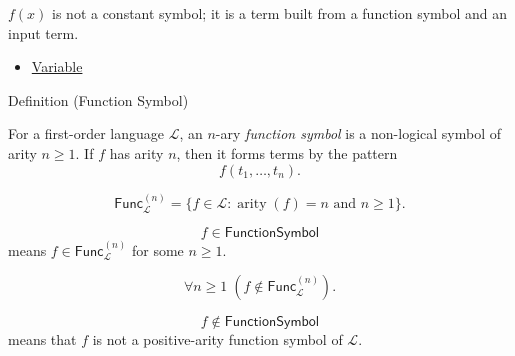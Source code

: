 \begin{remark*}
\(f(x)\) is not a constant symbol; it is a term built from a function symbol
and an input term.
\end{remark*}

\begin{dependencies}
\begin{itemize}
  \item \hyperref[def:variable]{Variable}
\end{itemize}
\end{dependencies}

\begin{definitionbox}{Definition (Function Symbol)}
\begin{definition}
\label{def:function-symbol}
For a first-order language \(\mathcal L\), an \(n\)-ary \emph{function symbol}
is a non-logical symbol of arity \(n\geq 1\). If \(f\) has arity \(n\), then it
forms terms by the pattern
\[
f(t_1,\ldots,t_n).
\]
\end{definition}
\end{definitionbox}

\begin{remark*}
\[
\mathsf{Func}_{\mathcal L}^{(n)}
=
\{f\in\mathcal L : \operatorname{arity}(f)=n\text{ and }n\geq 1\}.
\]
\end{remark*}

\begin{remark*}
\[
  f\in\mathsf{FunctionSymbol}
\] means
\(f\in\mathsf{Func}_{\mathcal L}^{(n)}\) for some \(n\geq 1\).
\end{remark*}

\begin{remark*}
\[
\forall n\geq 1\;(f\notin\mathsf{Func}_{\mathcal L}^{(n)}).
\]
\end{remark*}

\begin{remark*}
\[
  f\notin\mathsf{FunctionSymbol}
\] means that \(f\) is not a positive-arity
function symbol of \(\mathcal L\).
\end{remark*}


